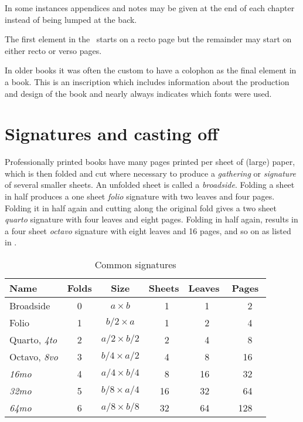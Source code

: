 \documentclass[10pt,letterpaper,extrafontsizes]{memoir}
\begin{document}
    In some instances appendices 
and notes may be given at the end of each
chapter instead of being lumped at the back.

    The first element in the \pixbackmatter\ starts on a recto page but the 
remainder may start on either recto or verso pages.

    In older books it was often the custom to have a colophon
as the final element in a book. This is an inscription which includes 
information about the production and design of the book and nearly 
always indicates which fonts were used.


\section{Signatures and casting off}

    Professionally printed books have many pages printed per sheet of (large)
paper, which is then folded and cut where necessary to produce a 
\emph{gathering} or \emph{signature} of several smaller 
sheets. An 
unfolded sheet is called a \emph{broadside}. 
Folding a sheet in half produces a one sheet 
\emph{folio} signature with two leaves and four pages. 
Folding it in half again and cutting along the original fold gives a 
two sheet \emph{quarto} signature with four leaves
and eight pages. 
Folding in half again, 
results in a four sheet \emph{octavo} signature with eight
leaves and 16 pages, and so on as listed in .

\begin{table}
\centering
\caption{Common signatures} \label{tab:signatures}
\begin{tabular}{lcccrccrccrc} \toprule
Name      & Folds & Size             & \multicolumn{3}{c}{Sheets} & 
\multicolumn{3}{c}{Leaves} & \multicolumn{3}{c}{Pages} \\ \midrule
Broadside & 0     & $a \times b$     & &  1 & & &  1 & & &   2 & \\
Folio     & 1     & $b/2 \times a$   & &  1 & & &  2 & & &   4 & \\
Quarto, \emph{4to} & 2 & $a/2 \times b/2$ & & 2 & & & 4 & & & 8 & \\
Octavo, \emph{8vo} & 3 & $b/4 \times a/2$ & & 4 & & & 8 & & & 16 & \\
\emph{16mo} & 4   & $a/4 \times b/4$ & &  8 & & & 16 & & &  32 & \\
\emph{32mo} & 5   & $b/8 \times a/4$ & & 16 & & & 32 & & &  64 & \\
\emph{64mo} & 6   & $a/8 \times b/8$ & & 32 & & & 64 & & & 128 & \\ \bottomrule
\end{tabular}%
%
%
\end{table}
\end{document}
